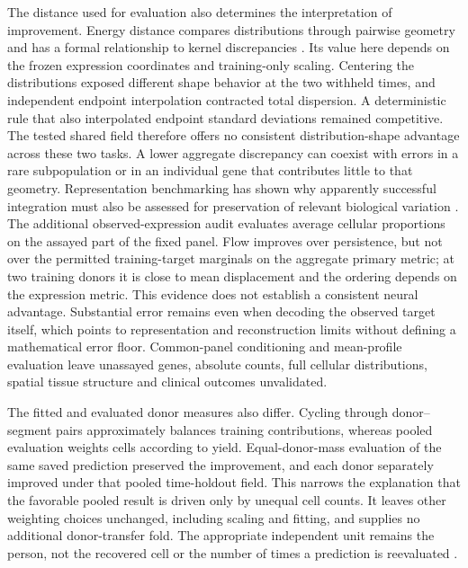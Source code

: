 \documentclass[10pt,a4paper]{article}
\begin{document}
The distance used for evaluation also determines the interpretation of improvement. Energy distance compares distributions through pairwise geometry and has a formal relationship to kernel discrepancies \citep{szekely2013,sejdinovic2013}. Its value here depends on the frozen expression coordinates and training-only scaling. Centering the distributions exposed different shape behavior at the two withheld times, and independent endpoint interpolation contracted total dispersion. A deterministic rule that also interpolated endpoint standard deviations remained competitive. The tested shared field therefore offers no consistent distribution-shape advantage across these two tasks. A lower aggregate discrepancy can coexist with errors in a rare subpopulation or in an individual gene that contributes little to that geometry. Representation benchmarking has shown why apparently successful integration must also be assessed for preservation of relevant biological variation \citep{luecken2022}. The additional observed-expression audit evaluates average cellular proportions on the assayed part of the fixed panel. Flow improves over persistence, but not over the permitted training-target marginals on the aggregate primary metric; at two training donors it is close to mean displacement and the ordering depends on the expression metric. This evidence does not establish a consistent neural advantage. Substantial error remains even when decoding the observed target itself, which points to representation and reconstruction limits without defining a mathematical error floor. Common-panel conditioning and mean-profile evaluation leave unassayed genes, absolute counts, full cellular distributions, spatial tissue structure and clinical outcomes unvalidated.

The fitted and evaluated donor measures also differ. Cycling through donor--segment pairs approximately balances training contributions, whereas pooled evaluation weights cells according to yield. Equal-donor-mass evaluation of the same saved prediction preserved the improvement, and each donor separately improved under that pooled time-holdout field. This narrows the explanation that the favorable pooled result is driven only by unequal cell counts. It leaves other weighting choices unchanged, including scaling and fitting, and supplies no additional donor-transfer fold. The appropriate independent unit remains the person, not the recovered cell or the number of times a prediction is reevaluated \citep{zimmerman2021}.
\end{document}
